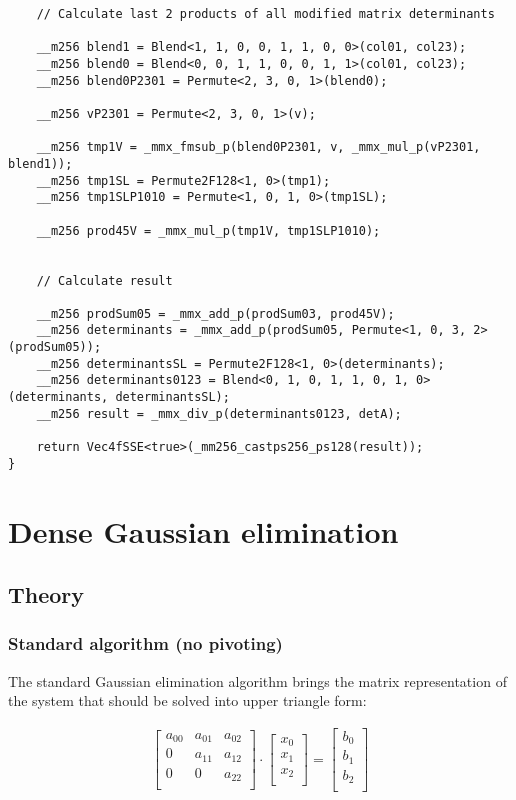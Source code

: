\documentclass[fontsize = 10pt,DIV = 13]{scrartcl}
\begin{document}
\begin{verbatim}
    // Calculate last 2 products of all modified matrix determinants

    __m256 blend1 = Blend<1, 1, 0, 0, 1, 1, 0, 0>(col01, col23);
    __m256 blend0 = Blend<0, 0, 1, 1, 0, 0, 1, 1>(col01, col23);
    __m256 blend0P2301 = Permute<2, 3, 0, 1>(blend0);

    __m256 vP2301 = Permute<2, 3, 0, 1>(v);

    __m256 tmp1V = _mmx_fmsub_p(blend0P2301, v, _mmx_mul_p(vP2301, blend1));
    __m256 tmp1SL = Permute2F128<1, 0>(tmp1);
    __m256 tmp1SLP1010 = Permute<1, 0, 1, 0>(tmp1SL);

    __m256 prod45V = _mmx_mul_p(tmp1V, tmp1SLP1010);


    // Calculate result

    __m256 prodSum05 = _mmx_add_p(prodSum03, prod45V);
    __m256 determinants = _mmx_add_p(prodSum05, Permute<1, 0, 3, 2>(prodSum05));
    __m256 determinantsSL = Permute2F128<1, 0>(determinants);
    __m256 determinants0123 = Blend<0, 1, 0, 1, 1, 0, 1, 0>(determinants, determinantsSL);
    __m256 result = _mmx_div_p(determinants0123, detA);

    return Vec4fSSE<true>(_mm256_castps256_ps128(result));
}
\end{verbatim}


\section{Dense Gaussian elimination}

\subsection{Theory}

\subsubsection{Standard algorithm (no pivoting)}
The standard Gaussian elimination algorithm brings the matrix representation of the system that should be solved into upper triangle form:


\begin{align}
\label{eq:gauss3x3upperTriangle}
\begin{bmatrix}
a_{00}&a_{01}&a_{02}\\
0&a_{11}&a_{12}\\
0&0&a_{22}\\
\end{bmatrix}
\cdot
\begin{bmatrix}
x_0\\
x_1\\
x_2\\
\end{bmatrix}
=
\begin{bmatrix}
b_0\\
b_1\\
b_2\\
\end{bmatrix}
\end{align}
\end{document}
